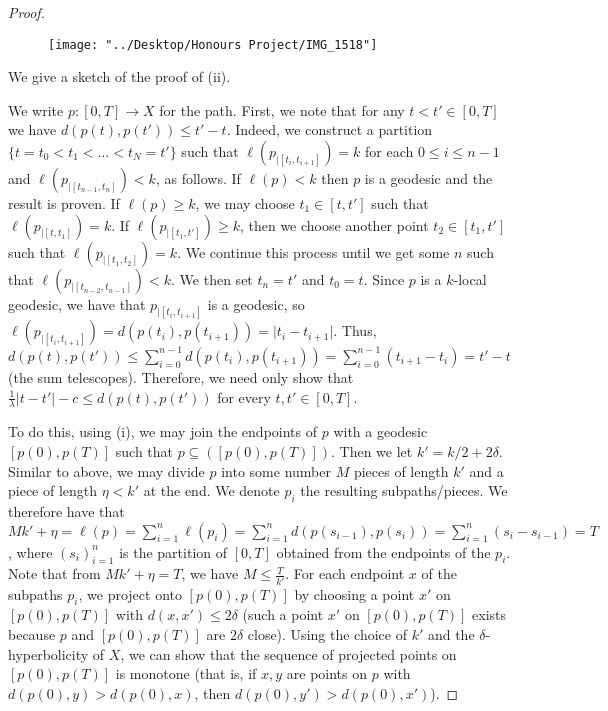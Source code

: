 \documentclass[12pt]{article}
\newcommand{\vs}{\vskip10pt}
\begin{document}
\begin{proof}
\begin{figure} [h]
	\centering
	\texttt{[image: "../Desktop/Honours Project/IMG\_1518"]}
	\caption{}
	\label{fig:img1518}
\end{figure}
		
		\vs
		
		We give a sketch of the proof of (ii).
		
		\vs 
		
		We write $p: [0, T] \rightarrow X$ for the path. First, we note that for any $t < t' \in [0,T]$ we have $d(p(t), p(t')) \leq  t' - t $. Indeed, we construct a partition $\{t = t_0 < t_1 < ... < t_N = t'\}$ such that $\ell(p_{\vert [t_i, t_{i+1}]}) = k$ for each $0 \leq i  \leq n-1$ and $\ell(p_{\vert [t_{n-1}, t_{n}]}) < k$, as follows. If $\ell(p) < k$ then $p$ is a geodesic and the result is proven. If $\ell(p) \geq k$, we may choose $t_1 \in [t,t']$ such that $\ell(p_{\vert [t, t_1]}) = k$. If $\ell(p_{\vert [t_1, t']}) \geq k$, then we choose another point $t_2 \in [t_1, t']$ such that $\ell(p_{\vert [t_1, t_2]}) = k$. We continue this process until we get some $n$ such that $\ell(p_{\vert [t_{n-2}, t_{n-1}]}) < k$. We then set $t_{n} = t'$ and $t_0 = t$. Since $p$ is a $k$-local geodesic, we have that $p_{\vert [t_i, t_{i+1}]}$ is a geodesic, so $\ell(p_{\vert [t_i, t_{i+1}]}) = d(p(t_i), p(t_{i+1})) = \vert t_i - t_{i+1} \vert$. Thus, $d(p(t), p(t')) \leq \sum_{i = 0}^{n-1} d(p(t_i), p(t_{i+1})) = \sum_{i=0}^{n-1} (t_{i+1} - t_i) = t' - t$ (the sum telescopes). Therefore, we need only show that $\frac{1}{\lambda}  \vert t - t' \vert - c \leq d(p(t), p(t'))$ for every $t,t' \in [0, T]$. 
		
		\vs 
		
		To do this, using (i), we may join the endpoints of $p$ with a geodesic $[p(0), p(T)]$ such that $p \subseteq([p(0), p(T)])$. Then we let $k' = k/2 + 2 \delta$. Similar to above, we may divide $p$ into some number $M$ pieces of length $k'$ and a piece of length $\eta < k'$ at the end. We denote $p_i$ the resulting subpaths/pieces. We therefore have that $Mk' + \eta = \ell(p) = \sum_{i=1}^n \ell(p_i) = \sum_{i=1}^n d(p(s_{i-1}), p(s_i)) = \sum_{i=1}^n (s_i - s_{i-1}) = T$, where $(s_i)_{i=1}^n$ is the partition of $[0, T]$ obtained from the endpoints of the $p_i$. Note that from $Mk' + \eta = T$, we have $M \leq \frac{T}{k'}$. For each endpoint $x$ of the subpaths $p_i$, we project onto $[p(0), p(T)]$ by choosing a point $x'$ on $[p(0), p(T)]$ with $d(x, x') \leq 2 \delta$ (such a point $x'$ on $[p(0), p(T)]$ exists because $p$ and $[p(0), p(T)]$ are $2 \delta$ close). Using the choice of $k'$ and the $\delta$-hyperbolicity of $X$, we can show that the sequence of projected points on $[p(0), p(T)]$ is monotone (that is, if $x,y$ are points on $p$ with $d(p(0), y) > d(p(0), x)$, then $d(p(0), y') > d(p(0), x')$). 
		

\end{proof}
\end{document}
